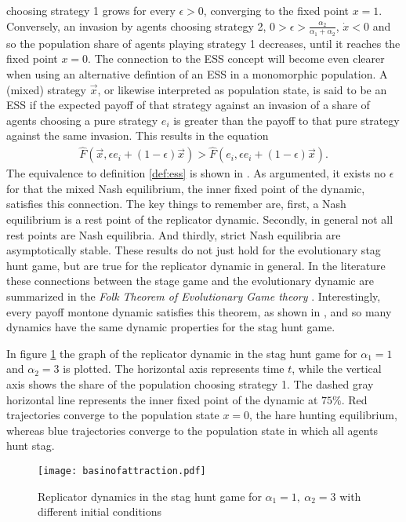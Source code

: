 choosing strategy 1 grows for every $\epsilon >0$, converging to the 
fixed point $x = 1$. Conversely, an invasion by agents choosing strategy 2,
$0 > \epsilon > \frac{\alpha_2}{\alpha_1+\alpha_2}$,
$\dot{x} < 0$ and so the population share of agents 
playing strategy 1 decreases, until it reaches the 
fixed point $x=0$. 
The connection to the ESS concept will become even clearer when using an 
alternative defintion of an ESS in a monomorphic population. 
A (mixed) strategy $\vec{x}$, or likewise 
interpreted as population state, is said to be an ESS if the 
expected payoff of that strategy against an invasion of a share of agents
choosing a pure strategy $e_i$ is greater than the payoff to that
pure strategy against the same invasion.
This results in the equation 
\begin{align*}
\hat{F}(\vec{x},\epsilon e_i + (1-\epsilon) \vec{x}) >
\hat{F}(e_i,\epsilon e_i + (1-\epsilon) \vec{x}).
\end{align*}
The equivalence to definition \eqref{def:ess} is shown in 
\textcite[37]{weibull_evolutionary_1997}.
As argumented, it exists no $\epsilon$ for that the mixed Nash equilibrium, 
the inner fixed point of the dynamic, satisfies this connection.
The key things to remember are, first, a Nash equilibrium is a rest point of
the replicator dynamic. Secondly, in general not all rest points are 
Nash equilibria. And thirdly, strict Nash equilibria 
are asymptotically stable. These results do not just hold for
the evolutionary stag hunt game, but are true for the replicator dynamic
in general. In the literature these connections between the stage game
and the evolutionary dynamic are summarized in the
\textit{Folk Theorem of Evolutionary Game theory} 
\parencite[25]{szabo_evolutionary_2007}. Interestingly, every payoff
montone dynamic satisfies this theorem, as shown in 
\textcite{hofbauer_evolutionary_2003}, and so many dynamics have the same
dynamic properties for the stag hunt game. 

In figure \ref{fig:basinofattraction} the graph of the replicator dynamic
in the stag hunt game for $\alpha_1=1$ and $\alpha_2=3$ is plotted. The
horizontal axis represents time $t$, while the vertical axis shows
the share of the population choosing strategy 1. The dashed gray horizontal
line represents the inner fixed point of the dynamic at $75\%$.
Red trajectories converge to the population state $x=0$, the hare hunting
equilibrium, whereas blue trajectories converge to the population state in 
which all agents hunt stag.
\begin{figure}
 \centering
        \texttt{[image: basinofattraction.pdf]}
        \caption[Replicator dynamic of the stag hunt game]{Replicator dynamics in the stag hunt game for 
                $\alpha_1=1,\ \alpha_2=3$ with different initial conditions}
                \label{fig:basinofattraction}
\end{figure}

